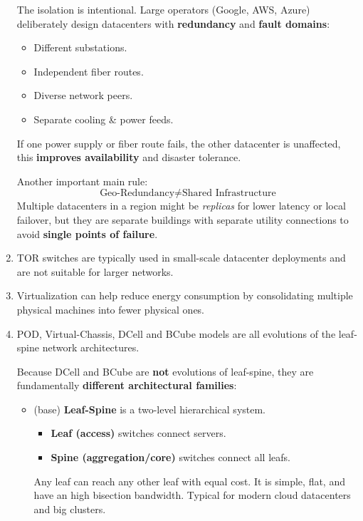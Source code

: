 \begin{enumerate}
\begin{deepeningbox}
        \highspace
        The isolation is intentional. Large operators (Google, AWS, Azure) deliberately design datacenters with \textbf{redundancy} and \textbf{fault domains}:
        \begin{itemize}
            \item Different substations.
            \item Independent fiber routes.
            \item Diverse network peers.
            \item Separate cooling \& power feeds.
        \end{itemize}
        If one power supply or fiber route fails, the other datacenter is unaffected, this \textbf{improves availability} and disaster tolerance.

        \highspace
        Another important main rule:
        \begin{equation*}
            \text{Geo-Redundancy} \ne \text{Shared Infrastructure}
        \end{equation*}
        Multiple datacenters in a region might be \emph{replicas} for lower latency or local failover, but they are separate buildings with separate utility connections to avoid \textbf{single points of failure}.
    \end{deepeningbox}
    \item \falseIcon \: TOR switches are typically used in small-scale datacenter deployments and are not suitable for larger networks.
    \item \trueIcon \: Virtualization can help reduce energy consumption by consolidating multiple physical machines into fewer physical ones.
    \item \falseIcon \: POD, Virtual-Chassis, DCell and BCube models are all evolutions of the leaf-spine network architectures.
    \begin{deepeningbox}
        Because DCell and BCube are \textbf{not} evolutions of leaf-spine, they are fundamentally \textbf{different architectural families}:
        \begin{itemize}
            \item (base) \textbf{Leaf-Spine} is a two-level hierarchical system.
            \begin{itemize}
                \item \textbf{Leaf (access)} switches connect servers.
                \item \textbf{Spine (aggregation/core)} switches connect all leafs.
            \end{itemize}
            Any leaf can reach any other leaf with equal cost. It is simple, flat, and have an high bisection bandwidth. Typical for modern cloud datacenters and big clusters.


\end{itemize}
\end{deepeningbox}
\end{enumerate}
